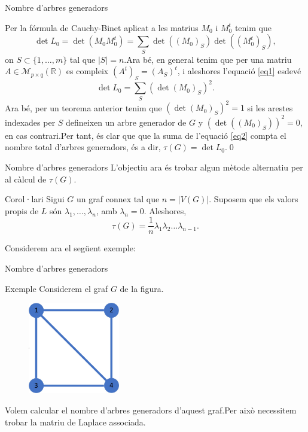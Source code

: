 \documentclass{beamer}
\begin{document}
\begin{frame}{Nombre d'arbres generadors}
    \begin{block}{}
        Per la fórmula de Cauchy-Binet aplicat a les matrius $M_0$ i $M_0^t$ tenim que \begin{equation}
            \det L_0=\det(M_0M_0^t)=\sum_S\det((M_0)_S)\det((M_0^t)_S),
            \label{eq1}
        \end{equation} on $S\subset\{1,\ldots,m\}$ tal que $|S|=n$.\pause\space Ara bé, en general tenim que per una matriu $A\in\mathcal{M}_{p\times q}(\mathbb{R})$ es compleix $(A^t)_S=(A_S)^t$, i aleshores l'equació \ref{eq1} esdevé
        \begin{equation}
            \det L_0=\sum_S(\det(M_0)_S)^2.
            \label{eq2}
        \end{equation}\pause
        Ara bé, per un teorema anterior tenim que $(\det(M_0)_S)^2=1$ si les arestes indexades per $S$ defineixen un arbre generador de $G$ y $(\det((M_0)_S))^2=0$, en cas contrari.\pause\space Per tant, és clar que que la suma de l'equació \ref{eq2} compta el nombre total d'arbres generadors, és a dir, $\tau(G)=\det L_0$.\qed
    \end{block}
\end{frame}
\begin{frame}{Nombre d'arbres generadors}
    L'objectiu ara és trobar algun mètode alternatiu per al càlcul de $\tau(G)$.\pause
    \begin{alertblock}{Corol·lari}
        Sigui $G$ un graf connex tal que $n=|V(G)|$. Suposem que els valors propis de $L$ són $\lambda_1,\ldots,\lambda_n$, amb $\lambda_n=0$. Aleshores, $$\tau(G)=\frac{1}{n}\lambda_1\lambda_2\ldots\lambda_{n-1}.$$
    \end{alertblock}\pause
    Considerem ara el següent exemple:
\end{frame}
\begin{frame}{Nombre d'arbres generadors}
    \begin{exampleblock}{Exemple}
        Considerem el graf $G$ de la figura.
        \begin{figure}[ht]
            \centering
            \includegraphics[width=4cm]{Imatges/graf1.jpg}
        \end{figure}
        Volem calcular el nombre d'arbres generadors d'aquest graf.\pause\space  Per això necessitem trobar la matriu de Laplace associada.
    \end{exampleblock}
\end{frame}
\end{document}
